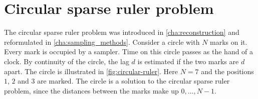 \documentclass[a4paper, openany, oneside]{memoir}
\begin{document}
\chapter{Circular sparse ruler problem}
\label{ap:circ-ruler}

The circular sparse ruler problem was introduced in \cref{cha:reconstruction} and reformulated in \cref{cha:sampling_methods}. Consider a circle with $N$ marks on it. Every mark is occupied by a sampler. Time on this circle passes as the hand of a clock. By continuity of the circle, the lag $d$ is estimated if the two marks are $d$ apart. The circle is illustrated in \cref{fig:circular-ruler}. Here $N=7$ and the positions $1$, $2$ and $3$ are marked. The circle is a solution to the circular sparse ruler problem, since the distances between the marks make up $0,\ldots,N-1$.
\end{document}
